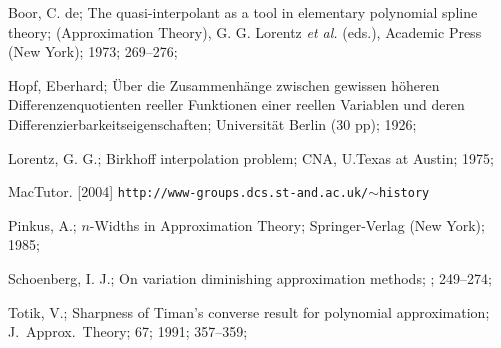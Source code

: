 
\References

  Boor, C. de;
The quasi-interpolant as a tool in elementary polynomial spline theory;
(Approximation Theory),
G. G. Lorentz {\it et al.} (eds.),
Academic Press (New York); 1973; 269--276;

 Hopf, Eberhard;
\"Uber die Zusammenh\"ange zwischen gewissen h\"oheren
   Diffe\-renzen\-quo\-tienten reeller Funktionen einer reellen Variablen und
  deren Dif\-fe\-renzier\-bar\-keits\-eigen\-schaften;
Universit\"at Berlin (30 pp); 1926;

 Lorentz,  G. G.;
Birkhoff interpolation problem;
CNA, U.Texas at Austin; 1975;

 MacTutor. [2004] {\tt http://www-groups.dcs.st-and.ac.uk/$\sim$history}

 Pinkus, A.;
$n$-Widths in Approximation Theory;
Springer-Verlag (New York); 1985;

 Schoenberg,  I. J.;
On variation diminishing approximation methods;
\Langer; 249--274;

 Totik, V.;
Sharpness of Timan's converse result for polynomial approximation;
J.~Approx.~Theory; 67; 1991; 357--359;

\bye %
